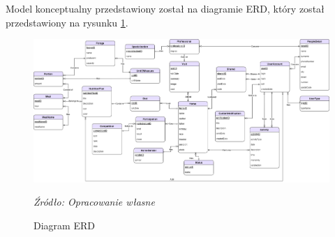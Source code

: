 \documentclass[12pt,twoside]{report}
\begin{document}
Model konceptualny przedstawiony został na diagramie ERD, który został przedstawiony na rysunku \ref{DiagramERD}.
\begin{figure}[H]
	\centering
		\includegraphics[scale=0.35, angle=-90]{DiagramERD}
		\caption{Diagram ERD}
		\textit{Źródło: Opracowanie własne}
		\label{DiagramERD}
\end{figure}
\end{document}
